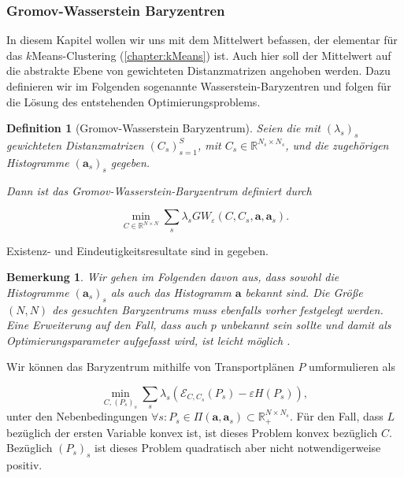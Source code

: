 \documentclass[twoside, 12pt,a4paper]{book}
\newtheorem{definition}[theorem]{Definition}
\newtheorem{remark}[theorem]{Bemerkung}
\numberwithin{equation}{section}
\begin{document}
	\subsubsection{Gromov-Wasserstein Baryzentren}
	In diesem Kapitel wollen wir uns mit dem \glqq Mittelwert\grqq{} befassen, der elementar für das $k$Means-Clustering (\autoref{chapter:kMeans}) ist.
	Auch hier soll der Mittelwert auf die abstrakte Ebene von gewichteten Distanzmatrizen angehoben werden.
	Dazu definieren wir im Folgenden sogenannte Wasserstein-Baryzentren und folgen \cite{gwd_averaging_kernels} für die Lösung des entstehenden Optimierungsproblems.
	\begin{definition}[Gromov-Wasserstein Baryzentrum]
		Seien die mit $(\lambda_s)_s$ gewichteten Distanzmatrizen $(C_s)_{s=1}^S$, mit $C_s \in \mathbb{R}^{N_s \times N_s}$, und die zugehörigen Histogramme $(\boldsymbol{a}_s)_s$ gegeben.
		
		\noindent Dann ist das Gromov-Wasserstein-Baryzentrum definiert durch
		
		\begin{equation}
		\min_{C \in \mathbb{R}^{N \times N}} \sum_s{\lambda_s GW_{\varepsilon}(C,C_s,\boldsymbol{a},\boldsymbol{a}_s)}. \label{eq:bary_prob}
		\end{equation}
	\end{definition}
	
	\noindent Existenz- und Eindeutigkeitsresultate sind in \cite{bary_wasserstein_space} gegeben.
	
	
	
	\begin{remark}
		Wir gehen im Folgenden davon aus, dass sowohl die Histogramme $(\boldsymbol{a}_s)_s$ als auch das Histogramm $\boldsymbol{a}$ bekannt sind. Die Größe $(N,N)$ des gesuchten Baryzentrums muss ebenfalls vorher festgelegt werden.
		Eine Erweiterung auf den Fall, dass auch $p$ unbekannt sein sollte und damit als Optimierungsparameter aufgefasst wird, ist leicht möglich \cite{gwd_averaging_kernels}.
	\end{remark}
	
	\noindent Wir können das Baryzentrum mithilfe von Transportplänen $P$ umformulieren als
	
	\begin{equation}
	\min_{C,(P_s)_s}{\sum_s{\lambda_s(\mathcal{E}_{C,C_s}(P_s) - \varepsilon H(P_s))}}, \label{eq:bary_prob_reformulated} 
	\end{equation}
	unter den Nebenbedingungen $ \forall s: P_s \in \Pi(\boldsymbol{a},\boldsymbol{a}_s) \subset \mathbb{R}_{+}^{N \times N_s}$. %
	Für den Fall, dass $L$ bezüglich der ersten Variable konvex ist, ist dieses Problem konvex bezüglich $C$. Bezüglich $(P_s)_s$ ist dieses Problem quadratisch aber nicht notwendigerweise positiv.
	
\end{document}
